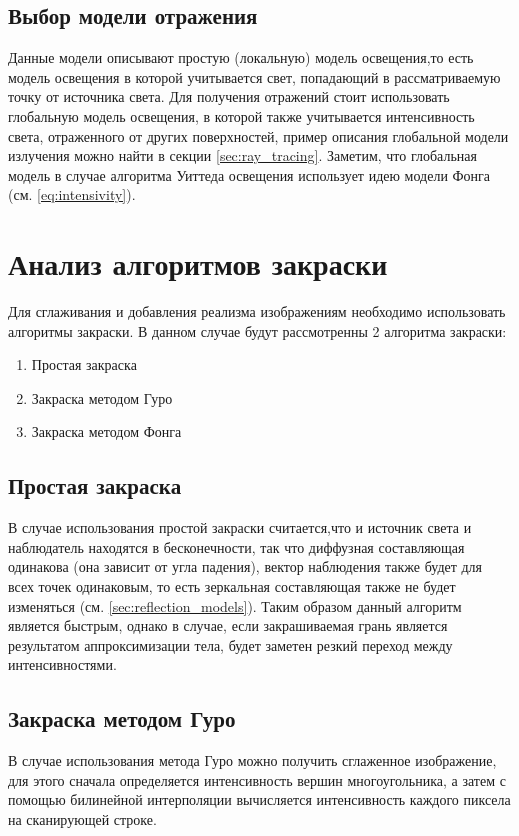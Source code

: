 \documentclass[a4paper,14pt, unknownkeysallowed]{extreport}
\begin{document}
\subsection{Выбор модели отражения}
Данные модели описывают простую (локальную) модель освещения,то есть модель освещения в которой учитывается свет, попадающий в рассматриваемую точку от источника света.
Для получения отражений стоит использовать глобальную модель освещения, в которой также учитывается интенсивность света, отраженного от других поверхностей, пример описания глобальной модели излучения можно найти в секции \ref{sec:ray_tracing}.
Заметим, что глобальная модель в случае алгоритма Уиттеда освещения использует идею модели Фонга (см. \ref{eq:intensivity}).


\section{Анализ алгоритмов закраски}
Для сглаживания и добавления реализма изображениям  необходимо использовать алгоритмы закраски.
В данном случае будут рассмотренны 2 алгоритма закраски:
\begin{enumerate}
	\item Простая закраска
	\item Закраска методом Гуро
	\item Закраска методом Фонга
\end{enumerate}

\subsection{Простая закраска}
В случае использования простой закраски считается,что и источник света и наблюдатель находятся в бесконечности,
так что диффузная составляющая одинакова (она зависит от угла падения), вектор наблюдения также будет для всех точек одинаковым, то есть зеркальная составляющая
также не будет изменяться (см. \ref{sec:reflection_models}). 
Таким образом данный алгоритм является быстрым, однако в случае, если закрашиваемая грань является результатом аппроксимизации тела, 
будет заметен резкий переход между интенсивностями. \cite{Rodgers}


\subsection{Закраска методом Гуро}
В случае использования метода Гуро можно получить сглаженное изображение, для этого сначала определяется интенсивность вершин многоугольника, а
затем с помощью билинейной интерполяции вычисляется интенсивность каждого пиксела на сканирующей строке.
\end{document}
